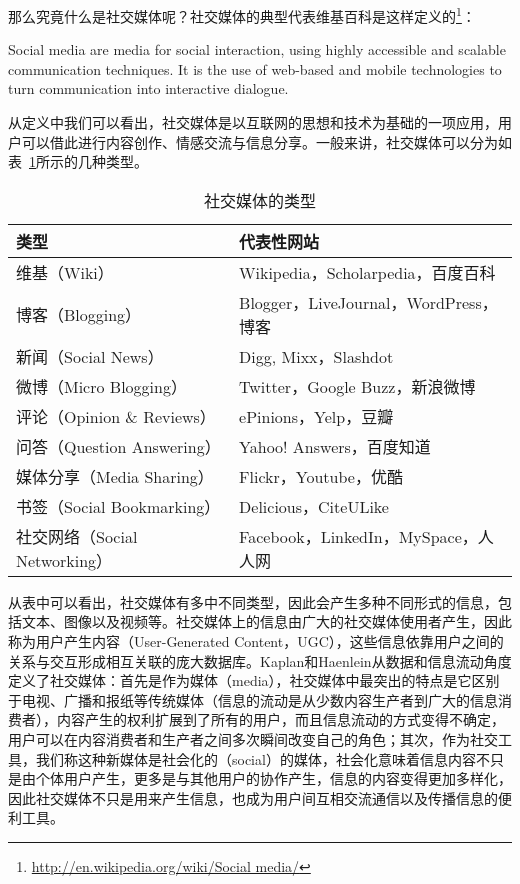 那么究竟什么是社交媒体呢？社交媒体的典型代表维基百科是这样定义的\footnote{\url{http://en.wikipedia.org/wiki/Social media/}}：

\begin{definition}
Social media are media for social interaction, using highly accessible and scalable communication techniques. It is the use of web-based and mobile technologies to turn communication into interactive dialogue.
\end{definition}
从定义中我们可以看出，社交媒体是以互联网的思想和技术为基础的一项应用，用户可以借此进行内容创作、情感交流与信息分享。一般来讲，社交媒体可以分为如表~\ref{tab1-2}所示的几种类型。

\begin{table}[htp]
\centering
\caption{社交媒体的类型}
\label{tab1-2}
 \begin{tabular}{|l|l|}
 \hline
 类型& 代表性网站\\
 \hline
 维基（Wiki） & Wikipedia，Scholarpedia，百度百科\\
 \hline
 博客（Blogging） & Blogger，LiveJournal，WordPress，博客\\
 \hline
 新闻（Social News） & Digg, Mixx，Slashdot\\
 \hline
 微博（Micro Blogging） & Twitter，Google Buzz，新浪微博\\
 \hline
 评论（Opinion \& Reviews） & ePinions，Yelp，豆瓣\\
 \hline
 问答（Question Answering） & Yahoo! Answers，百度知道\\
 \hline
 媒体分享（Media Sharing） & Flickr，Youtube，优酷\\
 \hline
 书签（Social Bookmarking） & Delicious，CiteULike\\
 \hline
 社交网络（Social Networking） & Facebook，LinkedIn，MySpace，人人网\\
 \hline
\end{tabular}
\end{table}

从表中可以看出，社交媒体有多中不同类型，因此会产生多种不同形式的信息，包括文本、图像以及视频等。社交媒体上的信息由广大的社交媒体使用者产生，因此称为用户产生内容（User-Generated Content，UGC），这些信息依靠用户之间的关系与交互形成相互关联的庞大数据库。Kaplan和Haenlein从数据和信息流动角度定义了社交媒体：首先是作为媒体（media），社交媒体中最突出的特点是它区别于电视、广播和报纸等传统媒体（信息的流动是从少数内容生产者到广大的信息消费者），内容产生的权利扩展到了所有的用户，而且信息流动的方式变得不确定，用户可以在内容消费者和生产者之间多次瞬间改变自己的角色；其次，作为社交工具，我们称这种新媒体是社会化的（social）的媒体，社会化意味着信息内容不只是由个体用户产生，更多是与其他用户的协作产生，信息的内容变得更加多样化，因此社交媒体不只是用来产生信息，也成为用户间互相交流通信以及传播信息的便利工具。

